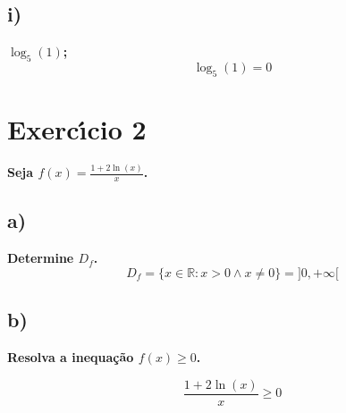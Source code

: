 \documentclass[a4paper]{article}
\begin{document}
\subsection*{i)}\textbf{$\log_{5}\left(1\right)$;}
\[\log_{5}\left(1\right)=0\]

\section*{Exercı́cio 2}\textbf{Seja $f(x)=\frac{1+2\ln{\left(x\right)}}{x}$.}

\subsection*{a)}\textbf{Determine $D_{f}$.}
\[D_{f}=\{x \in \mathbb{R}: x > 0 \land x \neq 0\}=]0,+\infty[\]

\subsection*{b)}\textbf{Resolva a inequação $f(x) \geq 0$.}

\[\frac{1+2\ln{\left(x\right)}}{x} \geq 0\]
\end{document}
